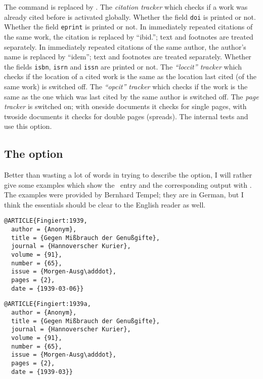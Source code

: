 \documentclass[english]{scrartcl}
\begin{document}
	  The command  is replaced by .
    The \emph{citation tracker} which checks if a work was already cited before
    is activated globally.
	  Whether the field \texttt{doi} is printed or not.
	  Whether the field \texttt{eprint} is printed or not.
	  In immediately repeated citations of the same work, the citation is
	  replaced by \enquote{ibid.}; text and footnotes are treated separately.
	  In immediately repeated citations of the same author, the author's name is
	  replaced by \enquote{idem}; text and footnotes are treated separately.
	  Whether the fields \texttt{isbn}, \texttt{isrn} and \texttt{issn} are printed or not.
    The \emph{\enquote{loccit} tracker} which checks if the location of a cited
    work is the same as the location last cited (of the same work) is switched
    off.
    The \emph{\enquote{opcit} tracker} which checks if the work is the same as 
    the one which was last cited by the same author is switched off.
    The \emph{page tracker} is switched on; with oneside documents it checks
    for single pages, with twoside documents it checks for double pages 
    (spreads). The internal tests  and  
    use this option.

\subsection{The option }
\label{journalnumberdate}
Better than wasting a lot of words in trying to describe the option, I will
rather give some examples which show the \BibTeX\ entry and the corresponding
output with . The examples were provided by 
Bernhard Tempel; they are in German, but I think the essentials should be 
clear to the English reader as well.

\begin{lstlisting}
@ARTICLE{Fingiert:1939,
  author = {Anonym},
  title = {Gegen Mißbrauch der Genußgifte},
  journal = {Hannoverscher Kurier},
  volume = {91},
  number = {65},
  issue = {Morgen-Ausg\adddot},
  pages = {2},
  date = {1939-03-06}}
\end{lstlisting}

\begin{lstlisting}
@ARTICLE{Fingiert:1939a,
  author = {Anonym},
  title = {Gegen Mißbrauch der Genußgifte},
  journal = {Hannoverscher Kurier},
  volume = {91},
  number = {65},
  issue = {Morgen-Ausg\adddot},
  pages = {2},
  date = {1939-03}}
\end{lstlisting}
\end{document}
